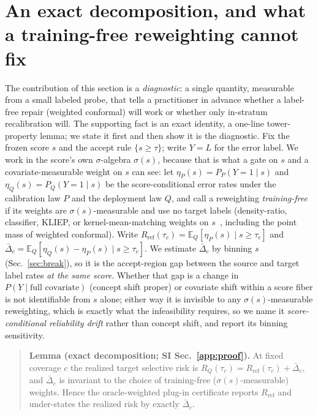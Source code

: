 \documentclass[10pt]{article}
\begin{document}
\section{An exact decomposition, and what a training-free reweighting cannot fix}\label{sec:decomp}
The contribution of this section is a \emph{diagnostic}: a single quantity, measurable from a small labeled
probe, that tells a practitioner in advance whether a label-free repair (weighted conformal) will work or
whether only in-stratum recalibration will. The supporting fact is an exact identity, a one-line
tower-property lemma; we state it first and then show it is the diagnostic.
Fix the frozen score $s$ and the accept rule $\{s\ge\tau\}$; write $Y=L$ for the error label. We work in the
score's own $\sigma$-algebra $\sigma(s)$, because that is what a gate on $s$ and a covariate-measurable
weight on $s$ can see: let $\eta_P(s)=P_P(Y{=}1\mid s)$ and $\eta_Q(s)=P_Q(Y{=}1\mid s)$ be the
score-conditional error rates under the calibration law $P$ and the deployment law $Q$, and call a
reweighting \emph{training-free} if its weights are $\sigma(s)$-measurable and use no target labels
(density-ratio, classifier, KLIEP, or kernel-mean-matching weights on $s$~\citep{kmmcp}, including the
point mass of weighted conformal). Write
$R_{\mathrm{ref}}(\tau_c)=\mathbb{E}_Q[\eta_P(s)\mid s\ge\tau_c]$ and
$\bar\Delta_c=\mathbb{E}_Q[\eta_Q(s)-\eta_P(s)\mid s\ge\tau_c]$. We estimate $\bar\Delta_c$ by binning $s$
(Sec.~\ref{sec:break}), so it is the accept-region gap between the source and target label rates \emph{at
the same score}. Whether that gap is a change in $P(Y\mid\text{full covariate})$ (concept shift proper) or
covariate shift within a score fiber is not identifiable from $s$ alone; either way it is invisible to any
$\sigma(s)$-measurable reweighting, which is exactly what the infeasibility requires, so we name it
\emph{score-conditional reliability drift} rather than concept shift, and report its binning sensitivity.

\begin{quote}\small
\textbf{Lemma (exact decomposition; SI Sec.~\ref{app:proof}).} At fixed coverage $c$ the realized target
selective risk is $R_Q(\tau_c)=R_{\mathrm{ref}}(\tau_c)+\bar\Delta_c$, and $\bar\Delta_c$ is invariant to
the choice of training-free ($\sigma(s)$-measurable) weights. Hence the oracle-weighted plug-in certificate
reports $R_{\mathrm{ref}}$ and under-states the realized risk by exactly $\bar\Delta_c$.
\end{quote}
\end{document}
